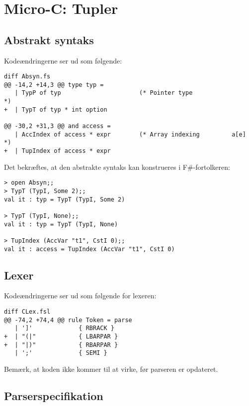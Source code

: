 \section{Micro-C: Tupler}

\subsection{Abstrakt syntaks}

Kodeændringerne ser ud som følgende:

\begin{verbatim}
diff Absyn.fs
@@ -14,2 +14,3 @@ type typ =
   | TypP of typ                      (* Pointer type                *)
+  | TypT of typ * int option
                                                                    
@@ -30,2 +31,3 @@ and access =
   | AccIndex of access * expr        (* Array indexing         a[e] *)
+  | TupIndex of access * expr
\end{verbatim}

Det bekræftes, at den abstrakte syntaks kan konstrueres i F\#-fortolkeren:

\begin{verbatim}
> open Absyn;;
> TypT (TypI, Some 2);;
val it : typ = TypT (TypI, Some 2)

> TypT (TypI, None);;
val it : typ = TypT (TypI, None)

> TupIndex (AccVar "t1", CstI 0);;
val it : access = TupIndex (AccVar "t1", CstI 0)
\end{verbatim}

\subsection{Lexer}

Kodeændringerne ser ud som følgende for lexeren:

\begin{verbatim}
diff CLex.fsl
@@ -74,2 +74,4 @@ rule Token = parse
   | ']'             { RBRACK }
+  | "(|"            { LBARPAR }
+  | "|)"            { RBARPAR }
   | ';'             { SEMI }
\end{verbatim}

Bemærk, at koden ikke kommer til at virke, før parseren er opdateret.

\subsection{Parserspecifikation}


